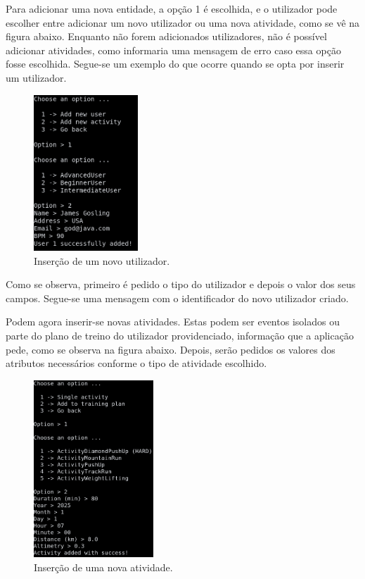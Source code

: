 \documentclass[12pt, a4paper]{article}
\begin{document}
Para adicionar uma nova entidade, a opção 1 é escolhida, e o utilizador pode escolher entre
adicionar um novo utilizador ou uma nova atividade, como se vê na figura abaixo. Enquanto não forem
adicionados utilizadores, não é possível adicionar atividades, como informaria uma mensagem de erro
caso essa opção fosse escolhida. Segue-se um exemplo do que ocorre quando se opta por inserir um
utilizador. \\

\begin{figure}[H]
    \centering
    \includegraphics[width=0.35\textwidth]{NewUser.png}
    \caption{Inserção de um novo utilizador.}
\end{figure}

Como se observa, primeiro é pedido o tipo do utilizador e depois o valor dos seus campos. Segue-se
uma mensagem com o identificador do novo utilizador criado.

Podem agora inserir-se novas atividades. Estas podem ser eventos isolados ou parte do plano de
treino do utilizador providenciado, informação que a aplicação pede, como se observa na figura
abaixo. Depois, serão pedidos os valores dos atributos necessários conforme o tipo de atividade
escolhido. \\

\begin{figure}[H]
    \centering
    \includegraphics[width=0.4\textwidth]{NewActivity.png}
    \caption{Inserção de uma nova atividade.}
\end{figure}
\end{document}

